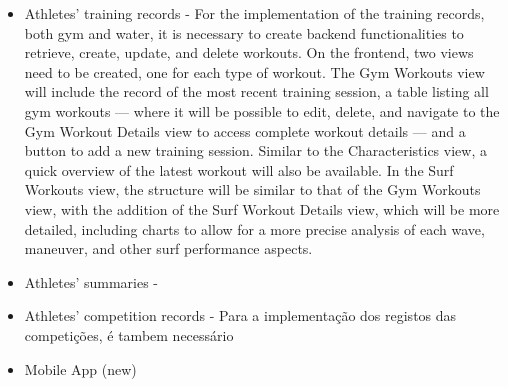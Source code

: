 \documentclass[a4paper,twoside,11pt]{article}
\begin{document}
\begin{itemize}
\item Athletes' training records - For the implementation of the training records, both gym and water, it is necessary to create backend functionalities to retrieve, create, update, and delete workouts. On the frontend, two views need to be created, one for each type of workout. The Gym Workouts view will include the record of the most recent training session, a table listing all gym workouts — where it will be possible to edit, delete, and navigate to the Gym Workout Details view to access complete workout details — and a button to add a new training session. Similar to the Characteristics view, a quick overview of the latest workout will also be available. In the Surf Workouts view, the structure will be similar to that of the Gym Workouts view, with the addition of the Surf Workout Details view, which will be more detailed, including charts to allow for a more precise analysis of each wave, maneuver, and other surf performance aspects.

\item Athletes' summaries - 

\item Athletes' competition records - Para a implementação dos registos das competições, é tambem necessário 

\item Mobile App (new)
\end{itemize}

% 
% 
\end{document}
